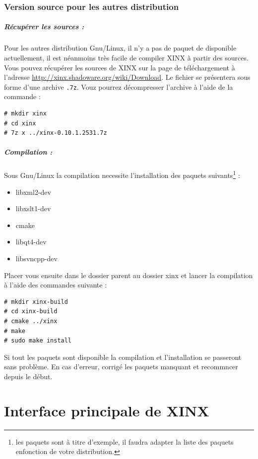 \documentclass[a4paper,10pt,twoside]{book}
\begin{document}
\subsection{Version source pour les autres distribution}

\paragraph{Récupérer les sources :}

Pour les autres distribution Gnu/Linux, il n'y a pas de paquet de disponible actuellement, il est néanmoins très facile de compiler XINX à partir des sources. Vous pouvez récupérer les sources de XINX sur la page de téléchargement à l'adresse \url{http://xinx.shadoware.org/wiki/Download}. Le fichier se présentera sous forme d'une archive \verb+.7z+. Vouz pourrez décompresser l'archive à l'aide de la commande :

\begin{verbatim}
# mkdir xinx
# cd xinx
# 7z x ../xinx-0.10.1.2531.7z
\end{verbatim}

\paragraph{Compilation :}

Sous Gnu/Linux la compilation necessite l'installation des paquets suivants\footnote{les paquets sont à titre d'exemple, il faudra adapter la liste des paquets enfonction de votre distribution.} :
\begin{itemize}
 \item libxml2-dev
 \item libxslt1-dev
 \item cmake
 \item libqt4-dev
 \item libsvncpp-dev 
\end{itemize}

Placer vous ensuite dans le dossier parent au dossier xinx et lancer la compilation à l'aide des commandes suivante :
\begin{verbatim}
# mkdir xinx-build
# cd xinx-build
# cmake ../xinx
# make
# sudo make install
\end{verbatim}

Si tout les paquets sont disponible la compilation et l'installation se passeront sans problème. En cas d'erreur, corrigé les paquets manquant et recommncer depuis le début.

\chapter{Interface principale de XINX}
\end{document}
